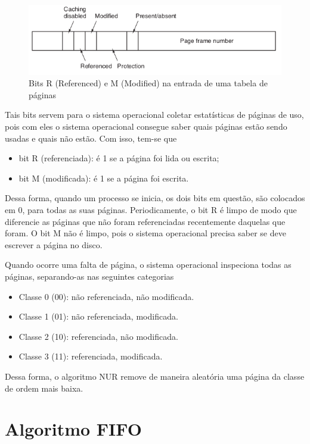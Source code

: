 \begin{figure}
	\includegraphics[scale=0.6]{ram-nru-1.png}
    \centering
    \caption{Bits R (Referenced) e M (Modified) na entrada de uma tabela de páginas}
    \label{ram-nru-1}
\end{figure}

Tais bits servem para o sistema operacional coletar estatísticas de páginas de uso, pois com eles o sistema operacional consegue saber quais páginas estão sendo usadas e quais não estão. Com isso, tem-se que 

\begin{itemize}
\renewcommand{\labelitemi}{}
\item bit R (referenciada): é 1 se a página foi lida ou escrita;
\item bit M (modificada): é 1 se a página foi escrita.
\end{itemize}

Dessa forma, quando um processo se inicia, os dois bits em questão, são colocados em 0, para todas as suas páginas. Periodicamente, o bit R é limpo de modo que diferencie as páginas que não foram referenciadas recentemente daquelas que foram. O bit M não é limpo, pois o sistema operacional precisa saber se deve escrever a página no disco.

Quando ocorre uma falta de página, o sistema operacional inspeciona todas as páginas, separando-as nas seguintes categorias

\begin{itemize}
\renewcommand{\labelitemi}{}
\item Classe 0 (00): não referenciada, não modificada.
\item Classe 1 (01): não referenciada, modificada.
\item Classe 2 (10): referenciada, não modificada.
\item Classe 3 (11): referenciada, modificada.
\end{itemize}

Dessa forma, o algoritmo NUR remove de maneira aleatória uma página da classe de ordem mais baixa.

\section{Algoritmo FIFO}

